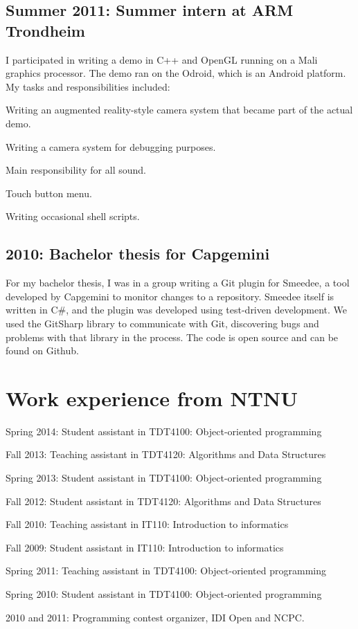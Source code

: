 \documentclass[letterpaper]{article}
\renewenvironment{itemize}{
  \begin{list}{}{
    \setlength{\leftmargin}{1.5em}
  }
}{
  \end{list}
}
\begin{document}
\subsection*{Summer 2011: Summer intern at ARM Trondheim}
I participated in writing a demo in C++ and OpenGL running on a Mali
graphics processor. The demo ran on the Odroid, which is an Android
platform.
My tasks and responsibilities included:
\begin{itemize}
\item Writing an augmented reality-style camera system that became
  part of the actual demo.
\item Writing a camera system for debugging purposes.
\item Main responsibility for all sound.
\item Touch button menu.
\item Writing occasional shell scripts.
\end{itemize}

\subsection*{2010: Bachelor thesis for Capgemini}
For my bachelor thesis, I was in a group writing a Git plugin for Smeedee, a tool developed by Capgemini to monitor
changes to a repository. Smeedee itself is written in C\#, and the
plugin was developed using test-driven development. We used the
GitSharp library to communicate with Git, discovering bugs and problems
with that library in the process. The code is open source and can be
found on Github.

\section*{Work experience from NTNU}
\begin{itemize}
\item Spring 2014: Student assistant in TDT4100: Object-oriented programming
\item Fall 2013: Teaching assistant in TDT4120: Algorithms and Data
  Structures
\item Spring 2013: Student assistant in TDT4100: Object-oriented programming
\item Fall 2012: Student assistant in TDT4120: Algorithms and Data Structures

\item Fall 2010: Teaching assistant in IT110: Introduction to informatics
\item Fall 2009: Student assistant in  IT110: Introduction to informatics

\item Spring 2011: Teaching assistant in  TDT4100: Object-oriented programming
\item Spring 2010: Student assistant in  TDT4100: Object-oriented programming

\item 2010 and 2011: Programming contest organizer, IDI Open and NCPC.
\end{itemize}
\end{document}
